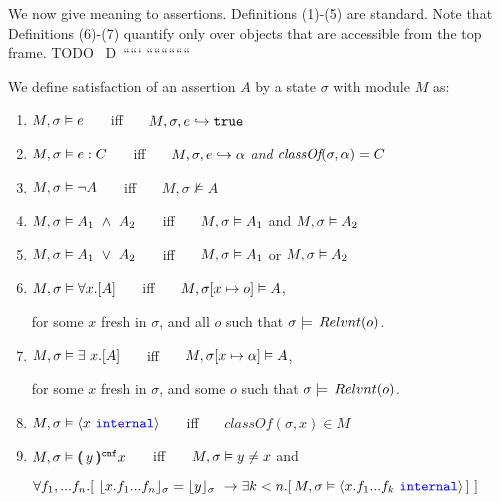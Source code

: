 We now give meaning to assertions. Definitions (1)-(5) are standard. Note that Definitions (6)-(7) quantify only over objects that are accessible from the top frame. TODO ~D~`````
````````````
\begin{definition} 
\label{def:chainmail-semantics}
We define satisfaction of an assertion $A$ by a %
state $\sigma$ with 
 module $M$ as:
\begin{enumerate}
\item
\label{cExpr}
$M , \sigma \vDash e$ \ \ \ iff \ \ \  $M, \sigma, e \hookrightarrow \texttt{true}$
\item
\label{cClass}
$M , \sigma \vDash e : C$ \ \ \ iff \ \ \  $M, \sigma, e \hookrightarrow \alpha$ \textit{and} $\textit{classOf}(\sigma, \alpha) = C$
\item
$M , \sigma \vDash \neg A$ \ \ \ iff \ \ \  ${M},{\sigma}\nvDash{A}$
\item
$\satisfiesA{M}{\sigma}{A_1\ \wedge\ A_2}$ \ \ \ iff \ \ \  $M , \sigma \vDash A_1$ and 
$M , \sigma \vDash A_2$
\item
$\satisfiesA{M}{\sigma}{A_1\ \vee\ A_2}$ \ \ \ iff \ \ \  $M , \sigma \vDash A_1$ or 
$M , \sigma \vDash A_2$
\item
\label{quant1}
$M , \sigma \vDash \forall x.[A]$ \ \ \ iff \ \ \  
$M , \sigma[x \mapsto o] \vDash A$, \\
\strut \hspace{1.3in}   for some $x$ fresh in $\sigma$, and all  $o$ such that $\sigma \models \,Relvnt(o)$.
\item
\label{quant2}
$M , \sigma \vDash \exists\ x.[A]$ \ \ \ iff \ \ \  
$M , \sigma[x \mapsto \alpha] \vDash A$, \\
\strut \hspace{1.3in}   for some $x$ fresh in $\sigma$, and some $o$ such that $\sigma \models \,Relvnt(o)$.
\item
\label{cInternal}
$M , \sigma \vDash \langle x\ {\color{blue}\texttt{internal}}\rangle$ \ \ \ iff \ \ \  
$\textit{classOf}(\sigma,x) \in M$
\item
\label{cProtected}
$M , \sigma \vDash (\!\!(\, y\, )\!\!)^{{\texttt{cnf}}} x$  \ \ \ iff \ \ \   $M , \sigma \vDash y \neq x$  and \\
\strut \hspace{1.3in} $\forall f_1,...f_n.[\ \interpret{\sigma}{x.f_1...f_n}=\interpret{\sigma}{y} \ \rightarrow \exists k<n. 
[\,\satisfiesA{M}{\sigma}{\internal{x.f_1...f_k}} \, ] \ ]$
\end{enumerate}
\end{definition}

